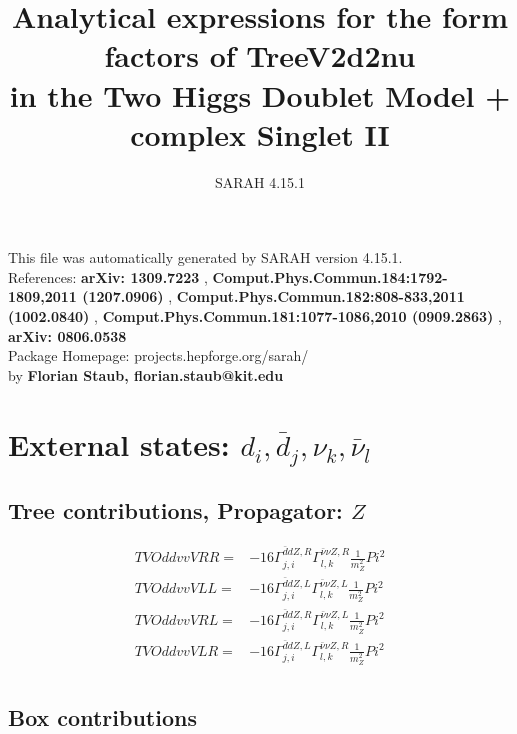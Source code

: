 \documentclass[A4,landscape]{article}
\begin{document}
\title{Analytical expressions for the form factors of TreeV2d2nu\\ in the Two Higgs Doublet Model + complex Singlet II } 
 \author{SARAH 4.15.1} 
 \maketitle 
 \vspace{10cm} 
This file was automatically generated by SARAH version 4.15.1.  \\ 
References: {\bf arXiv: 1309.7223 }, {\bf Comput.Phys.Commun.184:1792-1809,2011 (1207.0906) }, {\bf Comput.Phys.Commun.182:808-833,2011 (1002.0840) }, {\bf Comput.Phys.Commun.181:1077-1086,2010 (0909.2863) }, {\bf arXiv: 0806.0538 } \\ 
Package Homepage: projects.hepforge.org/sarah/ \\ 
by {\bf Florian Staub, florian.staub@kit.edu} 
 \pagebreak 
 \tableofcontents 
 \pagebreak 
\section{External states: ${d_{{i}}, \bar{d}_{{j}}, \nu_{{k}}, \bar{\nu}_{{l}}}$} 
\subsection{Tree contributions, Propagator: $Z$} 

\begin{align} 
  TVOddvvVRR= & -16 \Gamma^{\bar{d}d Z ,R}_{j, i} \Gamma^{\bar{\nu}\nu Z ,R}_{l, k} \frac{1}{m^2_{Z}} Pi^2 \\ 
  TVOddvvVLL= & -16 \Gamma^{\bar{d}d Z ,L}_{j, i} \Gamma^{\bar{\nu}\nu Z ,L}_{l, k} \frac{1}{m^2_{Z}} Pi^2 \\ 
  TVOddvvVRL= & -16 \Gamma^{\bar{d}d Z ,R}_{j, i} \Gamma^{\bar{\nu}\nu Z ,L}_{l, k} \frac{1}{m^2_{Z}} Pi^2 \\ 
  TVOddvvVLR= & -16 \Gamma^{\bar{d}d Z ,L}_{j, i} \Gamma^{\bar{\nu}\nu Z ,R}_{l, k} \frac{1}{m^2_{Z}} Pi^2 \\ 
\end{align} 
\subsection{Box contributions} 
\end{document}
